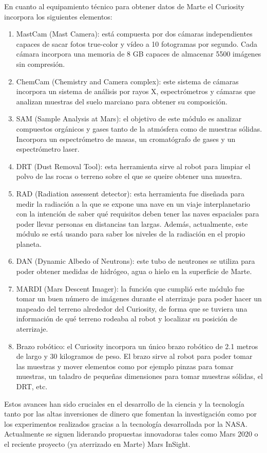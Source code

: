 En cuanto al equipamiento técnico para obtener datos de Marte el Curiosity incorpora los siguientes elementos:

\begin{enumerate}
  \item MastCam (Mast Camera): está compuesta por dos cámaras independientes capaces de sacar fotos true-color y vídeo a 10 fotogramas por segundo. Cada cámara incorpora una memoria de 8 GB capaces de almacenar 5500 imágenes sin compresión.
  \item ChemCam (Chemistry and Camera complex): este sistema de cámaras incorpora un sistema de análisis por rayos X, espectrómetros y cámaras que analizan muestras del suelo marciano para obtener su composición.
  \item SAM (Sample Analysis at Mars): el objetivo de este módulo es analizar compuestos orgánicos y gases tanto de la atmósfera como de muestras sólidas. Incorpora un espectrómetro de masas, un cromatógrafo de gases y un espectrómetro laser.
  \item DRT (Dust Removal Tool): esta herramienta sirve al robot para limpiar el polvo de las rocas o terreno sobre el que se queire obtener una muestra.
  \item RAD (Radiation assessent detector): esta herramienta fue diseñada para medir la radiación a la que se expone una nave en un viaje interplanetario con la intención de saber qué requisitos deben tener las naves espaciales para poder llevar personas en distancias tan largas. Además, actualmente, este módulo se está usando para saber los niveles de la radiación en el propio planeta.
  \item DAN (Dynamic Albedo of Neutrons): este tubo de neutrones se utiliza para poder obtener medidas de hidrógeo, agua o hielo en la superficie de Marte.
  \item MARDI (Mars Descent Imager): la función que cumplió este módulo fue tomar un buen número de imágenes durante el aterrizaje para poder hacer un mapeado del terreno alrededor del Curiosity, de forma que se tuviera una información de qué terreno rodeaba al robot y localizar su posición de aterrizaje.
  \item Brazo robótico: el Curiosity incorpora un único brazo robótico de 2.1 metros de largo y 30 kilogramos de peso. El brazo sirve al robot para poder tomar las muestras y mover elementos como por ejemplo pinzas para tomar muestras, un taladro de pequeñas dimensiones para tomar muestras sólidas, el DRT, etc.
\end{enumerate}

Estos avances han sido cruciales en el desarrollo de la ciencia y la tecnología tanto por las altas inversiones de dinero que fomentan la investigación como por los experimentos realizados gracias a la tecnología desarrollada por la NASA. Actualmente se siguen liderando propuestas innovadoras tales como Mars 2020 o el reciente proyecto (ya aterrizado en Marte) Mars InSight.

